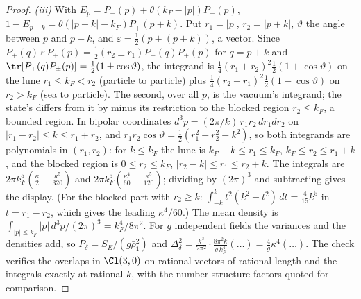 \begin{proof}
\emph{(iii)} With $E_{p} = P_{-}(p) + \theta(k_{F} - |p|)P_{+}(p)$, $1 - E_{p + k} = \theta(|p + k| - k_{F})P_{+}(p + k)$. Put $r_{1} = |p|$, $r_{2} = |p + k|$, $\vartheta$ the angle between $p$ and $p + k$, and $\varepsilon = \tfrac12(p + (p + k))$, a vector. Since $P_{+}(q)\,\varepsilon\,P_{\pm}(p) = \tfrac12(r_{2} \pm r_{1})P_{+}(q)P_{\pm}(p)$ for $q = p + k$ and $\tr[P_{+}(q)P_{\pm}(p)] = \tfrac12(1 \pm \cos\vartheta)$, the integrand is $\tfrac14(r_{1} + r_{2})^{2}\tfrac12(1 + \cos\vartheta)$ on the lune $r_{1} \le k_{F} < r_{2}$ (particle to particle) plus $\tfrac14(r_{2} - r_{1})^{2}\tfrac12(1 - \cos\vartheta)$ on $r_{2} > k_{F}$ (sea to particle). The second, over all $p$, is the vacuum's integrand; the state's differs from it by minus its restriction to the blocked region $r_{2} \le k_{F}$, a bounded region. In bipolar coordinates $d^{3}p = (2\pi/k)\,r_{1}r_{2}\,dr_{1}dr_{2}$ on $|r_{1} - r_{2}| \le k \le r_{1} + r_{2}$, and $r_{1}r_{2}\cos\vartheta = \tfrac12(r_{1}^{2} + r_{2}^{2} - k^{2})$, so both integrands are polynomials in $(r_{1}, r_{2})$: for $k \le k_{F}$ the lune is $k_{F} - k \le r_{1} \le k_{F}$, $k_{F} \le r_{2} \le r_{1} + k$, and the blocked region is $0 \le r_{2} \le k_{F}$, $|r_{2} - k| \le r_{1} \le r_{2} + k$. The integrals are $2\pi k_{F}^{5}(\tfrac{\kappa}{2} - \tfrac{\kappa^{5}}{320})$ and $2\pi k_{F}^{5}(\tfrac{\kappa^{4}}{60} - \tfrac{\kappa^{5}}{120})$; dividing by $(2\pi)^{3}$ and subtracting gives the display. (For the blocked part with $r_{2} \ge k$: $\int_{-k}^{k}t^{2}(k^{2} - t^{2})\,dt = \tfrac{4}{15}k^{5}$ in $t = r_{1} - r_{2}$, which gives the leading $\kappa^{4}/60$.) The mean density is $\int_{|p| \le k_{F}}|p|\,d^{3}p/(2\pi)^{3} = k_{F}^{4}/8\pi^{2}$. For $g$ independent fields the variances and the densities add, so $P_{\delta} = S_{E}/(g\bar\rho_{1}^{2})$ and $\Delta^{2}_{\delta} = \tfrac{k^{3}}{2\pi^{2}}\cdot\tfrac{8\pi^{2}k}{g\,k_{F}^{4}}(\dots) = \tfrac{4}{g}\kappa^{4}(\dots)$. The check verifies the overlaps in $\Cl(3,0)$ on rational vectors of rational length and the integrals exactly at rational $k$, with the number structure factors quoted for comparison.


\end{proof}
